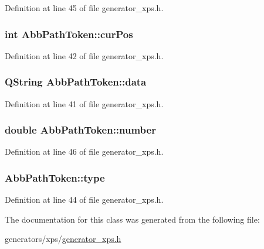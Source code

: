 Definition at line 45 of file generator\+\_\+xps.\+h.

\hypertarget{classAbbPathToken_adac8070c96e4b0270a2d7263a82a31f0}{
\subsubsection[{cur\+Pos}]{\setlength{\rightskip}{0pt plus 5cm}int Abb\+Path\+Token\+::cur\+Pos}}\label{classAbbPathToken_adac8070c96e4b0270a2d7263a82a31f0}


Definition at line 42 of file generator\+\_\+xps.\+h.

\hypertarget{classAbbPathToken_afae0f01c1cab7ae50d1c3c6cefce8e4e}{
\subsubsection[{data}]{\setlength{\rightskip}{0pt plus 5cm}Q\+String Abb\+Path\+Token\+::data}}\label{classAbbPathToken_afae0f01c1cab7ae50d1c3c6cefce8e4e}


Definition at line 41 of file generator\+\_\+xps.\+h.

\hypertarget{classAbbPathToken_a81ab3e9b8b12aea3ac25d0ce1ac71b8e}{
\subsubsection[{number}]{\setlength{\rightskip}{0pt plus 5cm}double Abb\+Path\+Token\+::number}}\label{classAbbPathToken_a81ab3e9b8b12aea3ac25d0ce1ac71b8e}


Definition at line 46 of file generator\+\_\+xps.\+h.

\hypertarget{classAbbPathToken_ae7c9fc519b1171a67b0dc99d07f2570b}{
\subsubsection[{type}]{ Abb\+Path\+Token\+::type}}\label{classAbbPathToken_ae7c9fc519b1171a67b0dc99d07f2570b}


Definition at line 44 of file generator\+\_\+xps.\+h.



The documentation for this class was generated from the following file\+:\begin{DoxyCompactItemize}
\item 
generators/xps/\hyperlink{generator__xps_8h}{generator\+\_\+xps.\+h}\end{DoxyCompactItemize}
